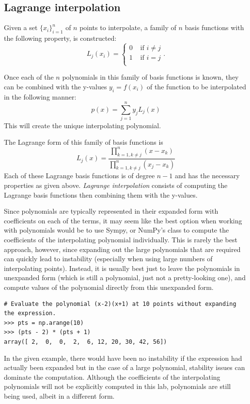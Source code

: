 \subsection*{Lagrange interpolation} %
Given a set $\{x_i\}_{i=1}^n$ of $n$ points to interpolate, a family of $n$ basis functions with the following property, is constructed:
\[
L_j(x_i) = \begin{cases} 0 &\mbox{ if } i \neq j\\ 1 &\mbox{ if } i =j \\ \end{cases}.
\]

Once each of the $n$ polynomials in this family of basis functions is known, they can be combined with the y-values $y_i=f(x_i)$ of the function to be interpolated in the following manner:
\begin{equation}
\label{equa:poly}
p(x) = \sum_{j=1}^n y_j L_j(x)
\end{equation}
This will create the unique interpolating polynomial.

The Lagrange form of this family of basis functions is
\begin{equation}
\label{equa:lagrange}
L_j(x) = \frac{\displaystyle\prod_{k=1, k \neq j}^n (x-x_k)}{\displaystyle\prod_{k=1, k \neq j}^n (x_j-x_k)}
\end{equation}
Each of these Lagrange basis functions is of degree $n-1$ and has the necessary properties as given above.
\emph{Lagrange interpolation} consists of computing the Lagrange basis functions then combining them with the y-values.

Since polynomials are typically represented in their expanded form with coefficients on each of the terms, it may seem like the best option when working with polynomials would be to use Sympy, or NumPy's
 class to compute the coefficients of the interpolating polynomial individually.
This is rarely the best approach, however, since expanding out the large polynomials that are required can quickly lead to instability (especially when using large
numbers of interpolating points).
Instead, it is usually best just to leave the polynomials in unexpanded form (which is still a polynomial, just not a pretty-looking one), and compute values of the polynomial directly from this unexpanded form.

\begin{lstlisting}
# Evaluate the polynomial (x-2)(x+1) at 10 points without expanding the expression.
>>> pts = np.arange(10)
>>> (pts - 2) * (pts + 1)
array([ 2,  0,  0,  2,  6, 12, 20, 30, 42, 56])
\end{lstlisting}
In the given example, there would have been no instability if the expression had actually been expanded but in the case of a large polynomial, stability issues can dominate the computation.
Although the coefficients of the interpolating polynomials will not be explicitly computed in this lab, polynomials are still being used, albeit in a different form.

